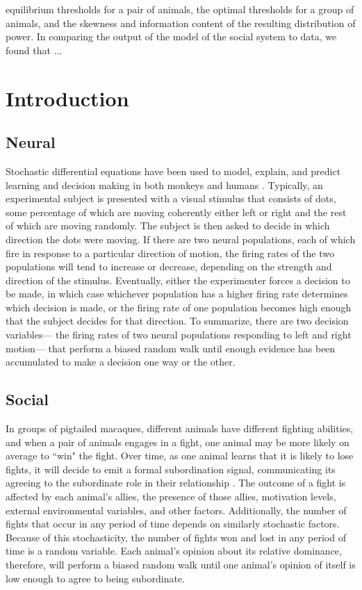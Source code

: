 \documentclass{article}
\begin{document}
equilibrium thresholds for a pair of animals, the optimal thresholds for a group of animals, and the skewness and information content of the resulting distribution of power.  In comparing the output of the model of the social system to data, we found that ...

\section{Introduction}

\subsection{Neural }
Stochastic differential equations have been used to model, explain, and predict learning and decision making in both monkeys and humans \citep{Eckhoff:2008uq, Brown:2005fk,Feng:2009kl,Bogacz:2006uq}.  Typically, an experimental subject is presented with a visual stimulus that consists of dots, some percentage of which are moving coherently either left or right and the rest of which are moving randomly.  The subject is then asked to decide in which direction the dots were moving.  If there are two neural populations, each of which fire in response to a particular direction of motion, the firing rates of the two populations will tend to increase or decrease, depending on the strength and direction of the stimulus.  Eventually, either the experimenter forces a decision to be made, in which case whichever population has a higher firing rate determines which decision is made, or the firing rate of one population becomes high enough that the subject decides for that direction.  To summarize, there are two decision variables--- the firing rates of two neural populations responding to left and right motion--- that perform a biased random walk until enough evidence has been accumulated to make a decision one way or the other.


\subsection{Social }
In groups of pigtailed macaques, different animals have different fighting abilities, and when a pair of animals engages in a fight, one animal may be more likely on average to ``win" the fight.  Over time, as one animal learns that it is likely to lose fights, it will decide to emit a formal subordination signal, communicating its agreeing to the subordinate role in their relationship \citep{Flack:2007kx, Flack:2006fk,Flack:2004oq, Waal:1985fk,Caldecott:1986uk}.  The outcome of a fight is affected by each animal's allies, the presence of those allies, motivation levels,  external environmental variables, and other factors.  Additionally, the number of fights that occur in any period of time depends on similarly stochastic factors.  Because of this stochasticity, the number of fights won and lost in any period of time is a random variable.  Each animal's opinion about its relative dominance, therefore, will perform a biased random walk until one animal's opinion of itself is low enough to agree to being subordinate.
\end{document}
